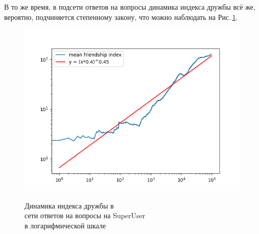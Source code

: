 \documentclass[bachelor, och, diploma]{SCWorks}
\begin{document}
В то же время, в подсети ответов на вопросы динамика индекса дружбы всё же, вероятно, подчиняется степенному закону, что можно наблюдать на Рис.\,\ref{fig:suaqd}.
\begin{figure}[!ht]
\centering
\includegraphics[scale=0.7]{diploma_results/dynamic_real_log/sx-superuser-a2q_mean.png}\\
\caption{Динамика индекса дружбы  в\\ сети ответов на вопросы на SuperUser\\ в логарифмической шкале}\label{fig:suaqd}
\end{figure}
\end{document}
